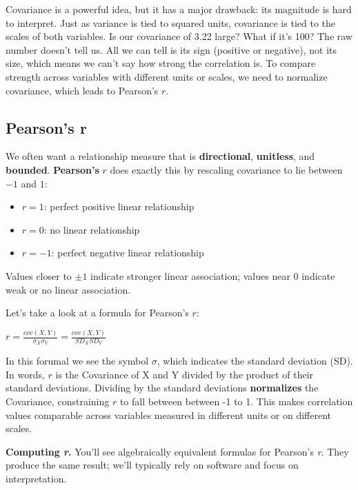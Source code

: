 \documentclass[
  letterpaper,
  DIV=11,
  numbers=noendperiod]{scrreprt}
\providecommand{\tightlist}{%
  \setlength{\itemsep}{0pt}\setlength{\parskip}{0pt}}
\begin{document}
Covariance is a powerful idea, but it has a major drawback: its
magnitude is hard to interpret. Just as variance is tied to squared
units, covariance is tied to the scales of both variables. Is our
covariance of 3.22 large? What if it's 100? The raw number doesn't tell
us. All we can tell is its sign (positive or negative), not its size,
which means we can't say how strong the correlation is. To compare
strength across variables with different units or scales, we need to
normalize covariance, which leads to Pearson's \(r\).

\subsection{Pearson's r}\label{pearsons-r}

We often want a relationship measure that is \textbf{directional},
\textbf{unitless}, and \textbf{bounded}. \textbf{Pearson's} \(r\) does
exactly this by rescaling covariance to lie between \(-1\) and \(1\):

\begin{itemize}
\tightlist
\item
  \(r=1\): perfect positive linear relationship
\item
  \(r=0\): no linear relationship
\item
  \(r=-1\): perfect negative linear relationship
\end{itemize}

Values closer to \(\pm1\) indicate stronger linear association; values
near \(0\) indicate weak or no linear association.

Let's take a look at a formula for Pearson's \(r\):

\(r = \frac{cov(X,Y)}{\sigma_{X}\sigma_{Y}} = \frac{cov(X,Y)}{SD_{X}SD_{Y}}\)

In this forumal we see the symbol \(\sigma\), which indicates the
standard deviation (SD). In words, \(r\) is the Covariance of X and Y
divided by the product of their standard deviations. Dividing by the
standard deviations \textbf{normalizes} the Covariance, constraining
\(r\) to fall between between -1 to 1. This makes correlation values
comparable across variables measured in different units or on different
scales.

\begin{tcolorbox}[enhanced jigsaw, breakable, colback=white, opacitybacktitle=0.6, coltitle=black, toprule=.15mm, bottomtitle=1mm, leftrule=.75mm, arc=.35mm, title=\textcolor{quarto-callout-note-color}{\faInfo}\hspace{0.5em}{Note}, opacityback=0, colframe=quarto-callout-note-color-frame, left=2mm, titlerule=0mm, toptitle=1mm, colbacktitle=quarto-callout-note-color!10!white, rightrule=.15mm, bottomrule=.15mm]

\textbf{Computing \emph{r}.} You'll see algebraically equivalent
formulas for Pearson's \emph{r}. They produce the same result; we'll
typically rely on software and focus on interpretation.

\end{tcolorbox}
\end{document}
